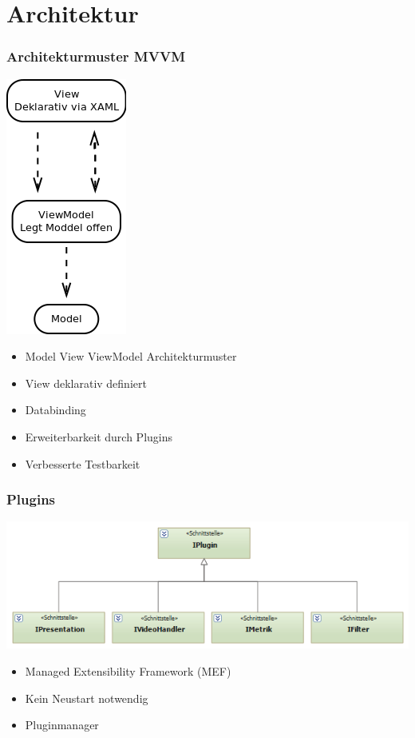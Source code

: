 \documentclass[t]{beamer}
\begin{document}
\section{Architektur}
\begin{frame}
\frametitle{Architekturmuster  MVVM}
\begin{minipage}{5,5cm}
\begin{center}
\includegraphics[scale=.5]{img/arch/mvvm.png}
\end{center}
\end{minipage}
\begin{minipage}{5,5cm}
\begin{itemize}
\itemsep1em
\item <+-> Model View ViewModel Architekturmuster
\item <+-> View deklarativ definiert
\item <+-> Databinding
\item <+-> Erweiterbarkeit durch Plugins
\item <+-> Verbesserte Testbarkeit
\end{itemize}
\end{minipage}
\end{frame}
\begin{frame}
\frametitle{Plugins}
\begin{center}
\includegraphics[scale=.5]{img/arch/IPluginStructure.png}
\end{center}
\begin{itemize}
\itemsep1em
\item <+-> Managed Extensibility Framework (MEF)
\item <+-> Kein Neustart notwendig
 \item <+-> Pluginmanager
\end{itemize}
\end{frame}
\end{document}
